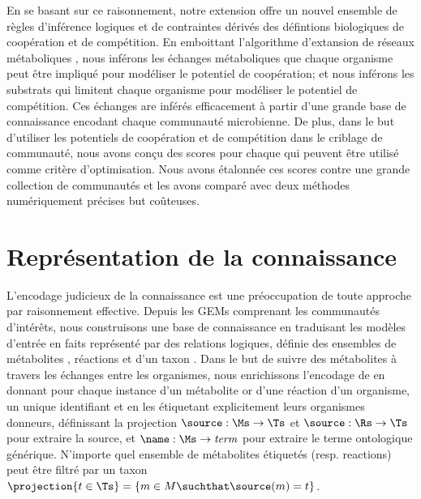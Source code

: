 En se basant sur ce raisonnement, notre extension offre un nouvel ensemble de règles d'inférence logiques et de contraintes dérivés des défintions biologiques de coopération et de compétition. En emboittant l'algorithme d'extansion de réseaux métaboliques \citep{Ebenhoh2004}, nous inférons les échanges métaboliques que chaque organisme peut être impliqué pour modéliser le potentiel de coopération; et nous inférons les substrats qui limitent chaque organisme pour modéliser le potentiel de compétition. Ces échanges are inférés efficacement à partir d'une grande base de connaissance encodant chaque communauté microbienne. De plus, dans le but d'utiliser les potentiels de coopération et de compétition dans le criblage de communauté, nous avons conçu des scores pour chaque qui peuvent être utilisé comme critère d'optimisation. Nous avons étalonnée ces scores contre une grande collection de communautés et les avons comparé avec deux méthodes numériquement précises but coûteuses. 

\section{Représentation de la connaissance}
L'encodage judicieux de la connaissance est une préoccupation de toute approche par raisonnement effective. Depuis les GEMs comprenant les communautés d'intérêts, nous construisons une base de connaissance en traduisant les modèles d'entrée en faits représenté par des relations logiques, définie des ensembles de métabolites \Ms, réactions \Rs et d'un taxon \Ts. Dans le but de suivre des métabolites à travers les échanges entre les organismes, nous enrichissons l'encodage de \citep{Frioux2018} en donnant  pour chaque instance d'un métabolite or d'une réaction d'un organisme, un unique identifiant et en les étiquetant explicitement leurs organismes donneurs, définissant la projection \( \source: \Ms \rightarrow \Ts\) et
\( \source: \Rs \rightarrow \Ts\) pour extraire la source, et
\( \name: \Ms \rightarrow \mbox{\textit{term}}\) pour extraire le terme ontologique générique. N'importe quel ensemble de métabolites étiquetés  (resp. reactions) peut être filtré par un taxon \(
\projection{t\in\Ts} = \{ m \in M \suchthat \source(m) = t \}
\).

